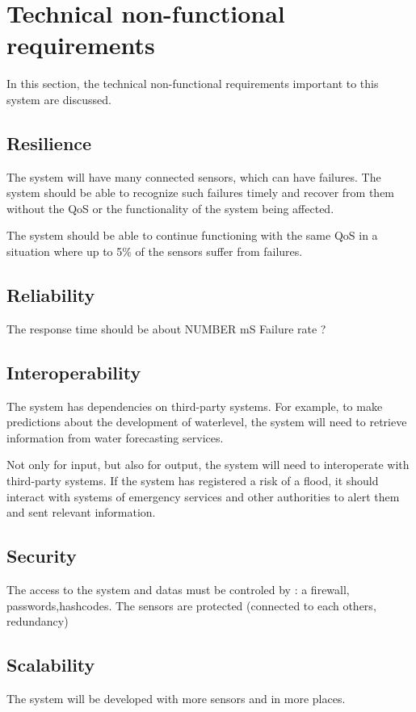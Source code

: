 \section{Technical non-functional requirements}

In this section, the technical non-functional requirements important to this system are discussed.

\subsection{Resilience}
The system will have many connected sensors, which can have failures. The system should be able to recognize such failures timely and recover from them without the QoS or the functionality of the system being affected. 

The system should be able to continue functioning with the same QoS in a situation where up to 5\% of the sensors suffer from failures.  %

\subsection{Reliability}
The response time should be about NUMBER mS
Failure rate ?

\subsection{Interoperability}
The system has dependencies on third-party systems. For example, to make predictions about the development of waterlevel, the system will need to retrieve information from water forecasting services. 

Not only for input, but also for output, the system will need to interoperate with third-party systems. If the system has registered a risk of a flood, it should interact with systems of emergency services and other authorities to alert them and sent relevant information.

\subsection{Security}
The access to the system and datas must be controled by : a firewall, passwords,hashcodes.
The sensors are protected (connected to each others, redundancy)

\subsection{Scalability}
The system will be developed with more sensors and in more places.

